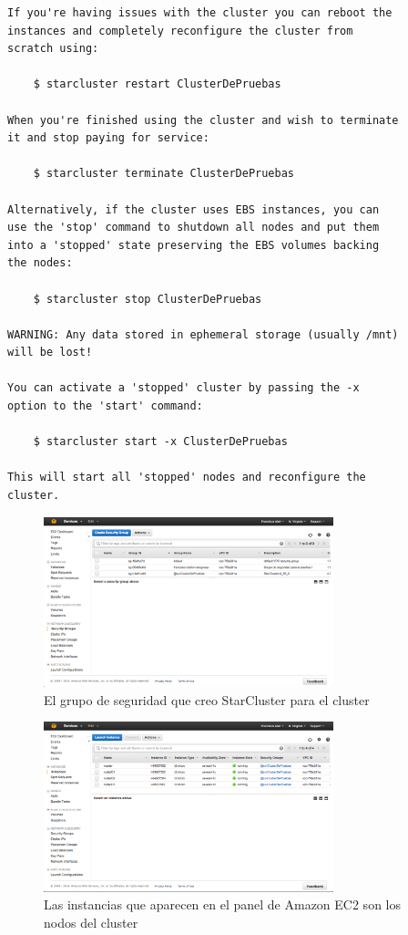 \documentclass{article}
\begin{document}
\begin{lstlisting}[style=miniBash]
If you're having issues with the cluster you can reboot the
instances and completely reconfigure the cluster from
scratch using:

    $ starcluster restart ClusterDePruebas

When you're finished using the cluster and wish to terminate
it and stop paying for service:

    $ starcluster terminate ClusterDePruebas

Alternatively, if the cluster uses EBS instances, you can
use the 'stop' command to shutdown all nodes and put them
into a 'stopped' state preserving the EBS volumes backing
the nodes:

    $ starcluster stop ClusterDePruebas

WARNING: Any data stored in ephemeral storage (usually /mnt)
will be lost!

You can activate a 'stopped' cluster by passing the -x
option to the 'start' command:

    $ starcluster start -x ClusterDePruebas

This will start all 'stopped' nodes and reconfigure the
cluster.
\end{lstlisting}

\begin{figure}[h]
  \centering
    \includegraphics[width=0.75\textwidth]{img/ClusterDePruebasSG.png}
  \caption{El grupo de seguridad que creo StarCluster para el cluster}
  \label{fig:ClusterDePruebasSG}
\end{figure}
\begin{figure}[h]
  \centering
    \includegraphics[width=0.75\textwidth]{img/ClusterDePruebasNODES.png}
  \caption{Las instancias que aparecen en el panel de Amazon EC2 son los nodos del cluster}
  \label{fig:ClusterDePruebasNODES}
\end{figure}
\end{document}

